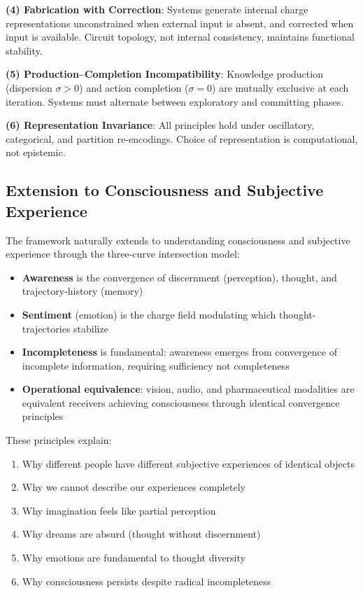 \documentclass[twocolumn,11pt,a4paper]{article}
\begin{document}
\textbf{(4) Fabrication with Correction}: Systems generate internal charge representations unconstrained when external input is absent, and corrected when input is available. Circuit topology, not internal consistency, maintains functional stability.

\textbf{(5) Production--Completion Incompatibility}: Knowledge production (dispersion $\sigma>0$) and action completion ($\sigma=0$) are mutually exclusive at each iteration. Systems must alternate between exploratory and committing phases.

\textbf{(6) Representation Invariance}: All principles hold under oscillatory, categorical, and partition re-encodings. Choice of representation is computational, not epistemic.

\subsection{Extension to Consciousness and Subjective Experience}

The framework naturally extends to understanding consciousness and subjective experience through the three-curve intersection model:

\begin{itemize}
\item \textbf{Awareness} is the convergence of discernment (perception), thought, and trajectory-history (memory)
\item \textbf{Sentiment} (emotion) is the charge field modulating which thought-trajectories stabilize
\item \textbf{Incompleteness} is fundamental: awareness emerges from convergence of incomplete information, requiring sufficiency not completeness
\item \textbf{Operational equivalence}: vision, audio, and pharmaceutical modalities are equivalent receivers achieving consciousness through identical convergence principles
\end{itemize}

These principles explain:
\begin{enumerate}[label=(\arabic*),leftmargin=*]
\item Why different people have different subjective experiences of identical objects
\item Why we cannot describe our experiences completely
\item Why imagination feels like partial perception
\item Why dreams are absurd (thought without discernment)
\item Why emotions are fundamental to thought diversity
\item Why consciousness persists despite radical incompleteness
\end{enumerate}
\end{document}
